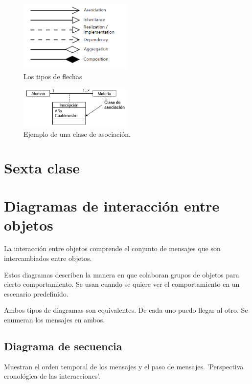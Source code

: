 \documentclass[titlepage,a4paper]{article}
\begin{document}
\begin{figure}[!htb]
    \centering
    \includegraphics[width=0.5\textwidth]{Imagenes/ClassDiagramArrowTypes.png}
    \caption{Los tipos de flechas}
\end{figure}

\begin{figure}[!htb]
    \centering
    \includegraphics[width=0.5\textwidth]{Imagenes/ClaseDeAsociacion.png}
    \caption{Ejemplo de una clase de asociación.}
\end{figure}


\newpage

\section*{Sexta clase}
\section{Diagramas de interacción entre objetos}
La interacción entre objetos comprende el conjunto de mensajes que son intercambiados entre objetos.

Estos diagramas describen la manera en que colaboran grupos de objetos para cierto comportamiento. Se usan cuando se quiere ver el comportamiento en un escenario predefinido.

Ambos tipos de diagramas son equivalentes. De cada uno puedo llegar al otro. Se enumeran los mensajes en ambos.

\subsection{Diagrama de secuencia}
Muestran el orden temporal de los mensajes y el paso de mensajes. 'Perspectiva cronológica de las interacciones'.
\end{document}
